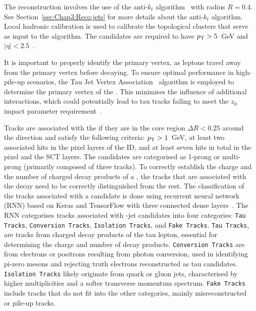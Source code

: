 


The \tauhad reconstruction involves the use of the anti-$k_t$ algorithm~\cite{Catani:1993hr, CMS-PAS-JME-09-001, Cacciari:2008gp} with radius $R=0.4$. See Section~\ref{sec:Chap3:Reco:jets} for more details about the anti-$k_t$ algorithm. Local hadronic calibration is used to calibrate the topological clusters that serve as input to the algorithm. The \tauhad candidates are required to have $p_{\text{T}}>5$~GeV and $|\eta|<2.5$~\cite{ATL-PHYS-PUB-2022-044}.  

It is important to properly identify the primary vertex, as \Ptau leptons travel away from the primary vertex before decaying.  
To ensure optimal performance in high-pile-up scenarios, the Tau Jet Vertex Association~\cite{ATLAS:2014rzk}
algorithm is employed to determine the primary vertex of the \tauhad. This minimises the
influence of additional interactions, which could potentially lead to tau tracks failing to 
meet the $z_0$ impact parameter requirement~\cite{ATLAS:2012voa}.  


Tracks are associated with the \tauhad if they are in the core region $\Delta R< 0.25$ around the \tauhad direction and satisfy the following criteria: $p_{\text{T}}>1$~GeV, at least two associated hits in the pixel layers of the
ID, and at least seven hits in total in the pixel and the SCT layers.
The \tauhad candidates are categorised as 1-prong or multi-prong (primarily composed of three tracks). To correctly establish the charge and the number of charged  decay products of a \tauhad, the tracks that are associated with the \tauhad decay need to be correctly distinguished from the rest.
The classification of the tracks associated with a \Ptau candidate is done using recurrent neural network (RNN) based on Keras and TensorFlow with three connected dense layers~\cite{ATLAS:2019uhp, ATL-PHYS-PUB-2022-044}. 
The RNN categorises tracks associated with \Ptau-jet candidates into four categories:
\texttt{Tau Tracks}, \texttt{Conversion Tracks}, \texttt{Isolation Tracks}, and \texttt{Fake Tracks}. 
\texttt{Tau Tracks}, are tracks from charged decay products of the tau lepton, essential for determining the charge and number of decay products. 
\texttt{Conversion Tracks} are from electrons or positrons resulting from photon conversion, used in identifying pi-zero mesons and rejecting truth electrons reconstructed as tau candidates. 
\texttt{Isolation Tracks} likely originate from quark or gluon jets, characterised by higher multiplicities and a softer transverse momentum spectrum. 
\texttt{Fake Tracks} include tracks that do not fit into the other categories, mainly misreconstructed or pile-up tracks.

